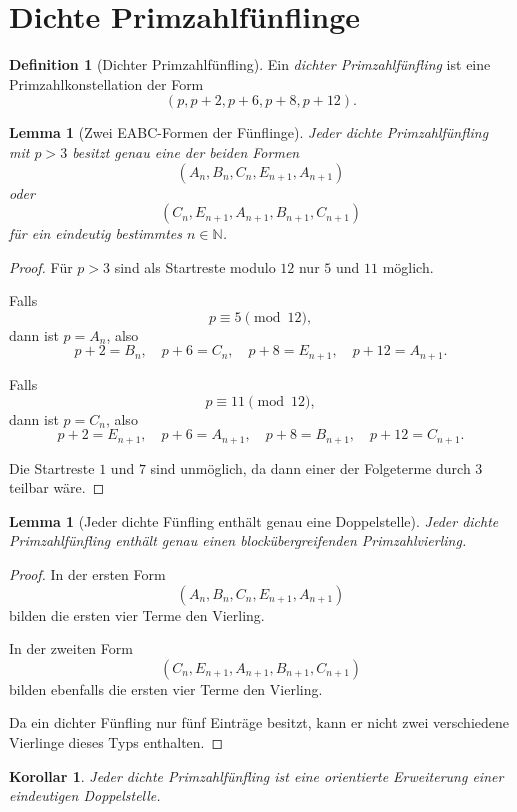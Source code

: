 \documentclass[11pt,a4paper]{article}
\newtheorem{lemma}[theorem]{Lemma}
\newtheorem{corollary}[theorem]{Korollar}
\theoremstyle{definition}
\newtheorem{definition}[theorem]{Definition}
\theoremstyle{remark}
\newcommand{\N}{\mathbb{N}}
\begin{document}
	\section{Dichte Primzahlfünflinge}
	
	\begin{definition}[Dichter Primzahlfünfling]
		Ein \emph{dichter Primzahlfünfling} ist eine Primzahlkonstellation der Form
		\[
		(p,p+2,p+6,p+8,p+12).
		\]
	\end{definition}
	
	\begin{lemma}[Zwei EABC-Formen der Fünflinge]
		Jeder dichte Primzahlfünfling mit \(p>3\) besitzt genau eine der beiden Formen
		\[
		(A_n,B_n,C_n,E_{n+1},A_{n+1})
		\]
		oder
		\[
		(C_n,E_{n+1},A_{n+1},B_{n+1},C_{n+1})
		\]
		für ein eindeutig bestimmtes \(n\in\N\).
	\end{lemma}
	
	\begin{proof}
		Für \(p>3\) sind als Startreste modulo \(12\) nur \(5\) und \(11\) möglich.
		
		Falls
		\[
		p\equiv 5 \pmod{12},
		\]
		dann ist \(p=A_n\), also
		\[
		p+2=B_n,\quad p+6=C_n,\quad p+8=E_{n+1},\quad p+12=A_{n+1}.
		\]
		
		Falls
		\[
		p\equiv 11 \pmod{12},
		\]
		dann ist \(p=C_n\), also
		\[
		p+2=E_{n+1},\quad p+6=A_{n+1},\quad p+8=B_{n+1},\quad p+12=C_{n+1}.
		\]
		
		Die Startreste \(1\) und \(7\) sind unmöglich, da dann einer der Folgeterme durch \(3\) teilbar wäre.
	\end{proof}
	
	\begin{lemma}[Jeder dichte Fünfling enthält genau eine Doppelstelle]
		Jeder dichte Primzahlfünfling enthält genau einen blockübergreifenden Primzahlvierling.
	\end{lemma}
	
	\begin{proof}
		In der ersten Form
		\[
		(A_n,B_n,C_n,E_{n+1},A_{n+1})
		\]
		bilden die ersten vier Terme den Vierling.
		
		In der zweiten Form
		\[
		(C_n,E_{n+1},A_{n+1},B_{n+1},C_{n+1})
		\]
		bilden ebenfalls die ersten vier Terme den Vierling.
		
		Da ein dichter Fünfling nur fünf Einträge besitzt, kann er nicht zwei verschiedene Vierlinge dieses Typs enthalten.
	\end{proof}
	
	\begin{corollary}
		Jeder dichte Primzahlfünfling ist eine orientierte Erweiterung einer eindeutigen Doppelstelle.
	\end{corollary}
	
\end{document}
